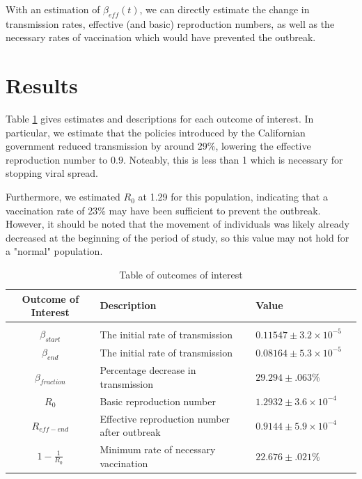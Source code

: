 \documentclass[11pt]{article}
\begin{document}
With an estimation of $\beta_{eff}(t)$, we can directly estimate the change in transmission rates, effective (and basic) 
reproduction numbers, as well as the necessary rates of vaccination which would have prevented the outbreak.

\section{Results}

    Table \ref{outcomes_table} gives estimates and descriptions for each outcome of interest. In particular, we
    estimate that the policies introduced by the Californian government reduced transmission by around 29\%,
    lowering the effective reproduction number to $0.9$.  Noteably, this is less than 1 which is necessary for
    stopping viral spread.

    Furthermore, we estimated $R_0$ at 1.29 for this population, indicating that a vaccination rate of 23\% may
    have been sufficient to prevent the outbreak.  However, it should be noted that the movement of individuals was
    likely already decreased at the beginning of the period of study, so this value may not hold for a "normal" population.

    \begin{table}[H]
        \begin{tabular}{ c l l l}
            Outcome of Interest     & Description                                   & Value \\
            \hline \\
            $\beta_{start}$         & The initial rate of transmission              & $0.11547 \pm 3.2\times10^{-5}$ \\
            $\beta_{end}$           & The initial rate of transmission              & $0.08164 \pm 5.3\times10^{-5}$ \\
            $\beta_{fraction}$      & Percentage decrease in transmission           & $29.294 \pm .063\%$ \\
            $R_0$                   & Basic reproduction number                     & $1.2932 \pm 3.6\times10^{-4}$ \\
            $R_{eff-end}$           & Effective reproduction number after outbreak  & $0.9144 \pm 5.9\times10^{-4}$ \\
            $1-\frac{1}{R_0}$       & Minimum rate of necessary vaccination         & $22.676 \pm .021\% $
        \end{tabular}
        \caption{Table of outcomes of interest}
        \label{outcomes_table}
    \end{table}
\end{document}
